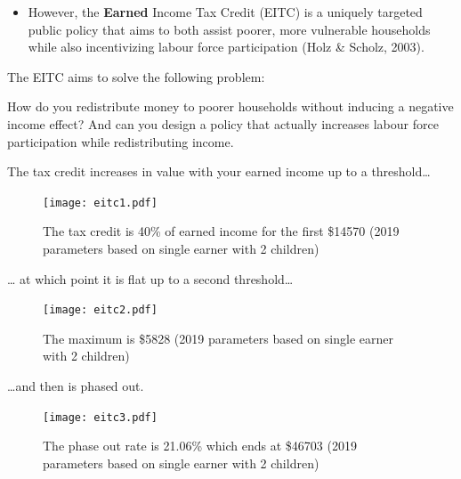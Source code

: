 \documentclass[
  letterpaper,
  DIV=11,
  numbers=noendperiod]{scrreprt}
\providecommand{\tightlist}{%
  \setlength{\itemsep}{0pt}\setlength{\parskip}{0pt}}\usepackage{longtable,booktabs,array}
\theoremstyle{definition}
\theoremstyle{remark}
\begin{document}
\begin{itemize}
\tightlist
\item
  However, the \textbf{Earned} Income Tax Credit (EITC) is a uniquely
  targeted public policy that aims to both assist poorer, more
  vulnerable households while also incentivizing labour force
  participation (Holz \& Scholz, 2003).
\end{itemize}

The EITC aims to solve the following problem:

\begin{tcolorbox}[enhanced jigsaw, breakable, colframe=quarto-callout-note-color-frame, toptitle=1mm, toprule=.15mm, opacitybacktitle=0.6, opacityback=0, rightrule=.15mm, titlerule=0mm, colback=white, bottomtitle=1mm, title={Note}, arc=.35mm, coltitle=black, colbacktitle=quarto-callout-note-color!10!white, leftrule=.75mm, bottomrule=.15mm, left=2mm]

How do you redistribute money to poorer households without inducing a
negative income effect? And can you design a policy that actually
increases labour force participation while redistributing income.

\end{tcolorbox}

The tax credit increases in value with your earned income up to a
threshold\ldots{}

\begin{figure}

{\centering \texttt{[image: eitc1.pdf]}

}

\caption{The tax credit is 40\% of earned income for the first \$14570
(2019 parameters based on single earner with 2 children)}

\end{figure}

\ldots{} at which point it is flat up to a second threshold\ldots{}

\begin{figure}

{\centering \texttt{[image: eitc2.pdf]}

}

\caption{The maximum is \$5828 (2019 parameters based on single earner
with 2 children)}

\end{figure}

\ldots and then is phased out.

\begin{figure}

{\centering \texttt{[image: eitc3.pdf]}

}

\caption{The phase out rate is 21.06\% which ends at \$46703 (2019
parameters based on single earner with 2 children)}

\end{figure}
\end{document}
